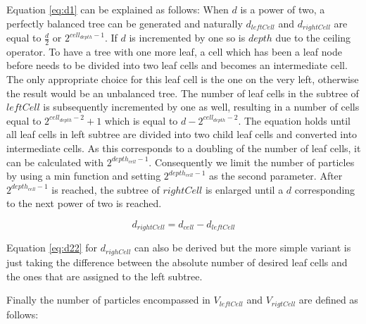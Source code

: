 \documentclass[]{article}
\begin{document}
Equation \ref{eq:d1} can be explained as follows: When $d$ is a power of two, a perfectly balanced tree can be generated and naturally $d_{leftCell}$ and $d_{rightCell}$ are equal to $\frac{d}{2}$ or $2^{cell_{depth} - 1}$. If $d$ is incremented by one so is $depth$ due to the ceiling operator. To have a tree with one more leaf, a cell which has been a leaf node before needs to be divided into two leaf cells and becomes an intermediate cell. The only appropriate choice for this leaf cell is the one on the very left, otherwise the result would be an unbalanced tree.
The number of leaf cells in the subtree of $leftCell$ is subsequently incremented by one as well, resulting in a number of cells equal to $2^{cell_{depth} - 2} + 1$ which is equal to $d - 2^{cell_{depth} - 2}$. The equation holds until all leaf cells in left subtree are divided into two child leaf cells and converted into intermediate cells. As this corresponds to a doubling of the number of leaf cells, it can be calculated with $2^{depth_{cell} - 1}$. Consequently we limit the number of particles by using a min function and setting $2^{depth_{cell} - 1}$ as the second parameter. After $2^{depth_{cell} - 1}$ is reached, the subtree of $rightCell$ is enlarged until a $d$ corresponding to the next power of two is reached. 

\begin{center}
	\begin{equation}  \label{eq:d22}
		d_{rightCell} = d_{cell} - d_{leftCell}
	\end{equation}
\end{center}

Equation \ref{eq:d22} for $d_{righCell}$ can also be derived but the more simple variant is just taking the difference between the absolute number of desired leaf cells and the ones that are assigned to the left subtree. 

\begin{comment}
The reason why equation \ref{eq:d1} and \ref{eq:d22} work when applied recursively can explained as follows: In a nearly complete tree there exists maximally one subtree of the same depth which is not a complete subtree. By definition of $d_{leftCell}$ and $d_{rightCell}$ either the left or the right subtree is complete. Furthermore we know that the number of cells in the left subtree are more or equal to the ones on the right subtree. Thus we can make a recursive proof:
\end{comment}

Finally the number of particles encompassed in $V_{leftCell}$ and $V_{rigtCell}$ are defined as follows:
\end{document}
